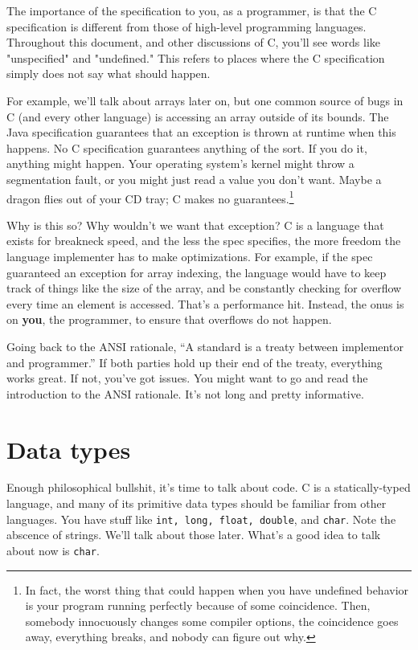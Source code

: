 \documentclass[ebook,11pt,oneside,openany]{memoir}
\newcommand{\cf}[1]{\texttt{#1}}
\begin{document}
The importance of the specification to you, as a programmer, is that the C specification is different from those of high-level programming languages. Throughout this document, and other discussions of C, you'll see words like "unspecified" and "undefined." This refers to places where the C specification simply does not say what should happen. 

For example, we'll talk about arrays later on, but one common source of bugs in C (and every other language) is accessing an array outside of its bounds. The Java specification guarantees that an exception is thrown at runtime when this happens. No C specification guarantees anything of the sort. If you do it, anything might happen. Your operating system's kernel might throw a segmentation fault, or you might just read a value you don't want. Maybe a dragon flies out of your CD tray; C makes no guarantees.\footnote{In fact, the worst thing that could happen when you have undefined behavior is your program running perfectly because of some coincidence. Then, somebody innocuously changes some compiler options, the coincidence goes away, everything breaks, and nobody can figure out why.} 

Why is this so? Why wouldn't we want that exception? C is a language that exists for breakneck speed, and the less the spec specifies, the more freedom the language implementer has to make optimizations. For example, if the spec guaranteed an exception for array indexing, the language would have to keep track of things like the size of the array, and be constantly checking for overflow every time an element is accessed. That's a performance hit. Instead, the onus is on \textbf{you}, the programmer, to ensure that overflows do not happen.

Going back to the ANSI rationale, ``A standard is a treaty between implementor and programmer.'' If both parties hold up their end of the treaty, everything works great. If not, you've got issues. You might want to go and read the introduction to the ANSI rationale. It's not long and pretty informative.

\section{Data types}

Enough philosophical bullshit, it's time to talk about code. C is a statically-typed language, and many of its primitive data types should be familiar from other languages. You have stuff like \cf{int, long, float, double}, and \cf{char}. Note the abscence of strings. We'll talk about those later. What's a good idea to talk about now is \cf{char}. 
\end{document}
